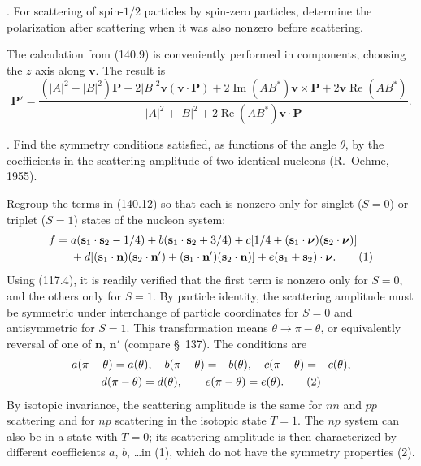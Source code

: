 . For scattering of spin-$1/2$ particles by spin-zero
particles, determine the polarization after scattering when it was also
nonzero before scattering.

\SolutionHeading The calculation from (140.9) is conveniently performed in
components, choosing the $z$ axis along $\mathbf v$. The result is
\[
 \mathbf P'=\frac{(|A|^2-|B|^2)\mathbf P+2|B|^2\mathbf v(\mathbf v\cdot\mathbf P)
 +2\operatorname{Im}(AB^*)\mathbf v\times\mathbf P
 +2\mathbf v\operatorname{Re}(AB^*)}
 {|A|^2+|B|^2+2\operatorname{Re}(AB^*)\mathbf v\cdot\mathbf P}.
\]

. Find the symmetry conditions satisfied, as functions of
the angle $\theta$, by the coefficients in the scattering amplitude of two
identical nucleons (R.~Oehme, 1955).

\SolutionHeading Regroup the terms in (140.12) so that each is nonzero only
for singlet ($S=0$) or triplet ($S=1$) states of the nucleon system:
\begin{align}
 f={}&a(\mathbf s_1\cdot\mathbf s_2-1/4)+b(\mathbf s_1\cdot\mathbf s_2+3/4)
 +c[1/4+(\mathbf s_1\cdot\boldsymbol\nu)(\mathbf s_2\cdot\boldsymbol\nu)]\notag\\
 &+d[(\mathbf s_1\cdot\mathbf n)(\mathbf s_2\cdot\mathbf n')
 +(\mathbf s_1\cdot\mathbf n')(\mathbf s_2\cdot\mathbf n)]
 +e(\mathbf s_1+\mathbf s_2)\cdot\boldsymbol\nu.
 \tag{1}
\end{align}
Using (117.4), it is readily verified that the first term is nonzero only for
$S=0$, and the others only for $S=1$. By particle identity, the scattering
amplitude must be symmetric under interchange of particle coordinates for
$S=0$ and antisymmetric for $S=1$. This transformation means
$\theta\to\pi-\theta$, or equivalently reversal of one of $\mathbf n$,
$\mathbf n'$ (compare \S~137). The conditions are
\begin{gather}
 a(\pi-\theta)=a(\theta),\quad b(\pi-\theta)=-b(\theta),\quad
 c(\pi-\theta)=-c(\theta),\notag\\
 d(\pi-\theta)=d(\theta),\qquad e(\pi-\theta)=e(\theta).
 \tag{2}
\end{gather}
By isotopic invariance, the scattering amplitude is the same for $nn$ and
$pp$ scattering and for $np$ scattering in the isotopic state $T=1$. The
$np$ system can also be in a state with $T=0$; its scattering amplitude is
then characterized by different coefficients $a$, $b$, \ldots in (1), which
do not have the symmetry properties (2).
